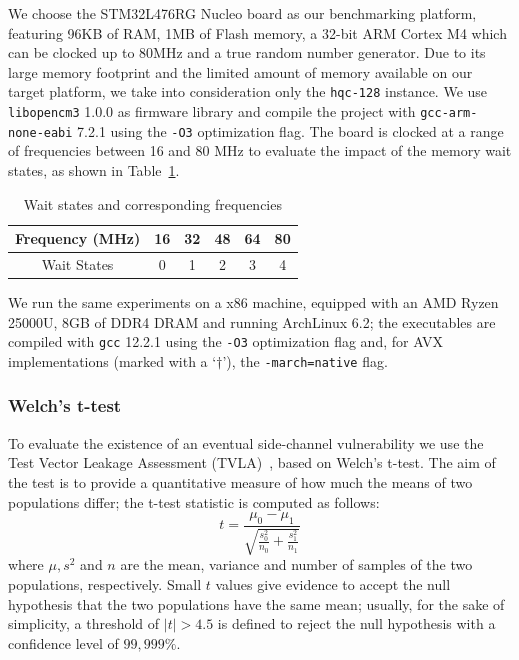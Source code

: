We choose the STM32L476RG Nucleo board as our benchmarking platform, featuring 96KB of RAM, 1MB of Flash memory,
a 32-bit ARM Cortex M4 which can be clocked up to 80MHz and a true random number generator.
Due to its large memory footprint and the limited amount of memory available on our target platform,
we take into consideration only the \texttt{hqc-128} instance. 
We use \texttt{libopencm3} 1.0.0 as firmware library and compile the project with \texttt{gcc-arm-none-eabi} 7.2.1
using the \texttt{-O3} optimization flag. The board is clocked at a range of frequencies between 16 and 80 MHz to
evaluate the impact of the memory wait states, as shown in Table~\ref{tab:waitstates}.

\begin{table}[ht]
    \centering
    \caption{Wait states and corresponding frequencies}
    \begin{tabular}{c|c c c c c}
        \toprule
        Frequency (MHz) & 16 & 32 & 48 & 64 & 80 \\
        \midrule
        Wait States & 0 & 1 & 2 & 3 & 4  \\
        \bottomrule
    \end{tabular}
    \label{tab:waitstates}
\end{table}

We run the same experiments on a x86 machine, equipped with an AMD Ryzen 25000U, 8GB of DDR4 DRAM and running ArchLinux 6.2; the executables are compiled with
\texttt{gcc} 12.2.1 using the \texttt{-O3} optimization flag and, for AVX implementations (marked with a `$\dagger$'), the \texttt{-march=native} flag. 

\vspace{-10pt}
\subsubsection{Welch's t-test}
To evaluate the existence of an eventual side-channel vulnerability we use the Test Vector Leakage Assessment (TVLA)~\cite{DBLP:journals/jce/SchneiderM16},
based on Welch's t-test. The aim of the test is to provide a quantitative measure of how much the means of two
populations differ; the t-test statistic is computed as follows:
\vspace{-10pt}
\begin{equation}
    t = \frac{\mu_0 - \mu_1}{\sqrt{\frac{s_0^2}{n_0} + \frac{s_1^2}{n_1}}}
\end{equation}  
\vspace{-2pt}
where $\mu, s^2$ and $n$ are the mean, variance and number of samples of the two populations, respectively.
Small $t$ values give evidence to accept the null hypothesis that the two populations have the same mean; 
usually, for the sake of simplicity, a threshold of $|t| > 4.5$ is defined to reject the null hypothesis with
a confidence level of $99,999\%$.


